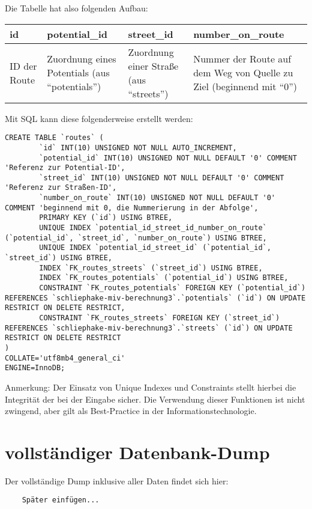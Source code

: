 \documentclass[fontsize=12pt,a4paper]{scrreprt}
\begin{document}
Die Tabelle hat also folgenden Aufbau:
\newline
\newline
\begin{tabular}[h]{|l|l|l|l|}
        \hline
        id & potential_id & street_id & number_on_route\\
        \hline
        ID der Route & Zuordnung eines Potentials (aus \enquote{potentials}) & Zuordnung einer Straße (aus \enquote{streets}) & Nummer der Route auf dem Weg von Quelle zu Ziel (beginnend mit \enquote{0})\\
        \hline
\end{tabular}
\newline
\newline
\newline
Mit SQL kann diese folgenderweise erstellt werden:
\begin{verbatim}
CREATE TABLE `routes` (
        `id` INT(10) UNSIGNED NOT NULL AUTO_INCREMENT,
        `potential_id` INT(10) UNSIGNED NOT NULL DEFAULT '0' COMMENT 'Referenz zur Potential-ID',
        `street_id` INT(10) UNSIGNED NOT NULL DEFAULT '0' COMMENT 'Referenz zur Straßen-ID',
        `number_on_route` INT(10) UNSIGNED NOT NULL DEFAULT '0' COMMENT 'beginnend mit 0, die Nummerierung in der Abfolge',
        PRIMARY KEY (`id`) USING BTREE,
        UNIQUE INDEX `potential_id_street_id_number_on_route` (`potential_id`, `street_id`, `number_on_route`) USING BTREE,
        UNIQUE INDEX `potential_id_street_id` (`potential_id`, `street_id`) USING BTREE,
        INDEX `FK_routes_streets` (`street_id`) USING BTREE,
        INDEX `FK_routes_potentials` (`potential_id`) USING BTREE,
        CONSTRAINT `FK_routes_potentials` FOREIGN KEY (`potential_id`) REFERENCES `schliephake-miv-berechnung3`.`potentials` (`id`) ON UPDATE RESTRICT ON DELETE RESTRICT,
        CONSTRAINT `FK_routes_streets` FOREIGN KEY (`street_id`) REFERENCES `schliephake-miv-berechnung3`.`streets` (`id`) ON UPDATE RESTRICT ON DELETE RESTRICT
)
COLLATE='utf8mb4_general_ci'
ENGINE=InnoDB;      
\end{verbatim}

Anmerkung: Der Einsatz von Unique Indexes und Constraints stellt hierbei die Integrität der bei der Eingabe sicher. Die Verwendung dieser Funktionen ist nicht zwingend, aber gilt als Best-Practice in der Informationstechnologie.


\section{vollständiger Datenbank-Dump}
Der vollständige Dump inklusive aller Daten findet sich hier:
    \begin{verbatim}
    Später einfügen...
    \end{verbatim}
\end{document}
